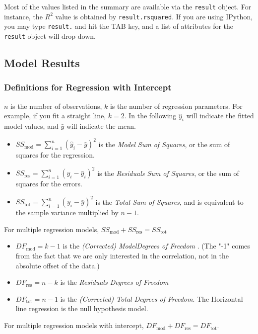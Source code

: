 Most of the values listed in the summary are available via the \lstinline{result} object. For instance, the $R^2$ value is obtained by \lstinline{result.rsquared}. If you are using IPython, you may type \lstinline{result.} and hit the TAB key, and a list of attributes for the \lstinline{result} object will drop down.

\subsection{Model Results}
\subsubsection{Definitions for Regression with Intercept}

$n$ is the number of observations, $k$ is the number of regression parameters. For example, if you fit a straight line, $k=2$.
In the following $\hat{y}_i$ will indicate the fitted model values, and $\bar{y}$ will indicate the mean.

\begin{itemize}
  \item $SS_\text{mod} = \sum_{i=1}^n (\hat{y}_i-\bar{y})^2$ is the \emph{Model Sum of Squares}, or the sum of squares for the regression.
  \item $SS_\text{res} = \sum_{i=1}^n (y_i-\hat{y}_i)^2$ is the \emph{Residuals Sum of Squares}, or the sum of squares for the errors.
  \item $SS_\text{tot} = \sum_{i=1}^n (y_i-\bar{y})^2$ is the \emph{Total Sum of Squares}, and is equivalent to the sample variance multiplied by $n-1$.
\end{itemize}

For multiple regression models, $SS_\text{mod} + SS_\text{res} = SS_\text{tot}$

\begin{itemize}
  \item $DF_\text{mod} = k - 1$ is the \emph{(Corrected) ModelDegrees of Freedom }. (The "-1" comes from the fact that we are only interested in the correlation, not in the absolute offset of the data.)
  \item $DF_\text{res} = n - k$ is the \emph{Residuals Degrees of Freedom}
  \item $DF_\text{tot} = n - 1$ is the \emph{(Corrected) Total Degrees of Freedom}. The Horizontal line regression is the null hypothesis model.
\end{itemize}

For multiple regression models with intercept, $DF_\text{mod} + DF_\text{res} = DF_\text{tot}$.

